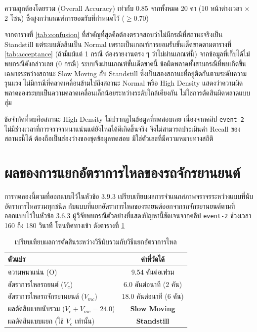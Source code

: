 ความถูกต้องโดยรวม (Overall Accuracy) เท่ากับ 0.85 จากทั้งหมด 20 ค่า (10 หน้าต่างเวลา $\times$ 2 โซน) ซึ่งสูงกว่าเกณฑ์การยอมรับที่กำหนดไว้ ($\geq 0.70$)

จากตารางที่ \ref{tab:confusion} ที่สำคัญที่สุดคือต้องตรวจสอบว่าไม่มีกรณีที่สถานะจริงเป็น Standstill แต่ระบบตัดสินเป็น Normal เพราะเป็นเกณฑ์การยอมรับขั้นเด็ดขาดตามตารางที่ \ref{tab:acceptance} (ถ้ามีแม้แต่ 1 กรณี ต้องรายงานตรง ๆ ว่าไม่ผ่านเกณฑ์นี้) จากข้อมูลที่เก็บได้ไม่พบกรณีดังกล่าวเลย (0 กรณี) ระบบจึงผ่านเกณฑ์ขั้นเด็ดขาดนี้ ข้อผิดพลาดทั้งสามกรณีที่พบเกิดขึ้นเฉพาะระหว่างสถานะ Slow Moving กับ Standstill ซึ่งเป็นสองสถานะที่อยู่ติดกันตามระดับความรุนแรง ไม่มีกรณีที่คลาดเคลื่อนข้ามไปถึงสถานะ Normal หรือ High Density แสดงว่าความผิดพลาดของระบบเป็นความคลาดเคลื่อนเล็กน้อยระหว่างระดับใกล้เคียงกัน ไม่ใช่การตัดสินผิดพลาดแบบสุ่ม

ข้อจำกัดที่พบคือสถานะ High Density ไม่ปรากฏในข้อมูลที่ทดสอบเลย เนื่องจากคลิป \texttt{event-2} ไม่มีช่วงเวลาที่การจราจรหนาแน่นแต่ยังไหลได้ดีเกิดขึ้นจริง จึงไม่สามารถประเมินค่า Recall ของสถานะนี้ได้ ต้องถือเป็นช่องว่างของชุดข้อมูลทดสอบ มิใช่ตัวเลขที่มีความหมายทางสถิติ

\section{ผลของการแยกอัตราการไหลของรถจักรยานยนต์}
\label{sec:res-separation}

การทดลองนี้ตามที่ออกแบบไว้ในหัวข้อ 3.9.3 เปรียบเทียบผลการจำแนกสภาพจราจรระหว่างแบบที่นับอัตราการไหลรวมทุกชนิด กับแบบที่แยกอัตราการไหลของรถยนต์ออกจากรถจักรยานยนต์ตามที่ออกแบบไว้ในหัวข้อ 3.6.3 ผู้วิจัยพบกรณีตัวอย่างที่แสดงปัญหานี้ชัดเจนจากคลิป \texttt{event-2} ช่วงเวลา 160 ถึง 180 วินาที โซนทิศทางเข้า ดังตารางที่ \ref{tab:motorcycle-separation}

\begin{table}[ht]
\centering
\caption{เปรียบเทียบผลการตัดสินระหว่างวิธีนับรวมกับวิธีแยกอัตราการไหล}
\label{tab:motorcycle-separation}
\begin{tabular}{|l|c|}
\hline
\textbf{ตัวแปร} & \textbf{ค่าที่วัดได้} \\
\hline
ความหนาแน่น (O) & 9.54 คันต่อเฟรม \\
\hline
อัตราการไหลรถยนต์ ($V_c$) & 6.0 คันต่อนาที (2 คัน) \\
\hline
อัตราการไหลรถจักรยานยนต์ ($V_{mc}$) & 18.0 คันต่อนาที (6 คัน) \\
\hline
ผลตัดสินแบบนับรวม ($V_c+V_{mc}=24.0$) & \textbf{Slow Moving} \\
\hline
ผลตัดสินแบบแยก (ใช้ $V_c$ เท่านั้น) & \textbf{Standstill} \\
\hline
\end{tabular}
\end{table}

